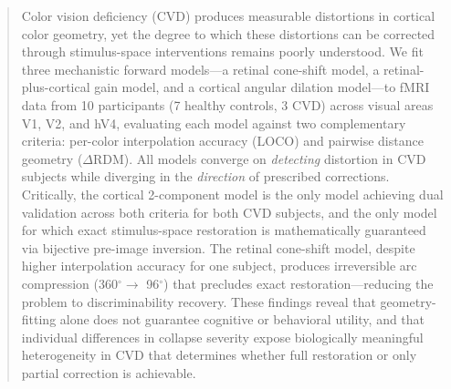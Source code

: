 \documentclass{article}
\begin{document}

\printAffiliationsAndNotice{}

\begin{abstract}
Color vision deficiency (CVD) produces measurable distortions in cortical color geometry, yet the degree to which these distortions can be corrected through stimulus-space interventions remains poorly understood.
We fit three mechanistic forward models---a retinal cone-shift model, a retinal-plus-cortical gain model, and a cortical angular dilation model---to fMRI data from 10 participants (7 healthy controls, 3 CVD) across visual areas V1, V2, and hV4, evaluating each model against two complementary criteria: per-color interpolation accuracy (LOCO) and pairwise distance geometry ($\Delta$RDM).
All models converge on \emph{detecting} distortion in CVD subjects while diverging in the \emph{direction} of prescribed corrections.
Critically, the cortical 2-component model is the only model achieving dual validation across both criteria for both CVD subjects, and the only model for which exact stimulus-space restoration is mathematically guaranteed via bijective pre-image inversion.
The retinal cone-shift model, despite higher interpolation accuracy for one subject, produces irreversible arc compression (360$^\circ \to$ 96$^\circ$) that precludes exact restoration---reducing the problem to discriminability recovery.
These findings reveal that geometry-fitting alone does not guarantee cognitive or behavioral utility, and that individual differences in collapse severity expose biologically meaningful heterogeneity in CVD that determines whether full restoration or only partial correction is achievable.
\end{abstract}
\end{document}
